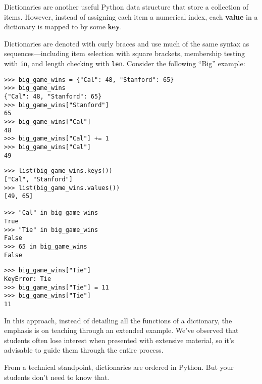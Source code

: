 \begin{blocksection}
Dictionaries are another useful Python data structure that store a collection of items. However, instead of assigning each item a numerical index, each \textbf{value} in a dictionary is mapped to by some \textbf{key}. 

Dictionaries are denoted with curly braces and use much of the same syntax as sequences---including item selection with square brackets, membership testing with \lstinline{in}, and length checking with \lstinline{len}. Consider the following ``Big'' example:
\begin{lstlisting}
>>> big_game_wins = {"Cal": 48, "Stanford": 65}
>>> big_game_wins 
{"Cal": 48, "Stanford": 65}
>>> big_game_wins["Stanford"]
65
>>> big_game_wins["Cal"]
48
>>> big_game_wins["Cal"] += 1
>>> big_game_wins["Cal"]
49
\end{lstlisting}
\end{blocksection}

\begin{blocksection}
\begin{lstlisting}
>>> list(big_game_wins.keys())
["Cal", "Stanford"]
>>> list(big_game_wins.values())
[49, 65]

>>> "Cal" in big_game_wins
True
>>> "Tie" in big_game_wins
False
>>> 65 in big_game_wins
False
\end{lstlisting}
\end{blocksection}

\begin{blocksection}
\begin{lstlisting}
>>> big_game_wins["Tie"]
KeyError: Tie
>>> big_game_wins["Tie"] = 11
>>> big_game_wins["Tie"]
11
\end{lstlisting}
\end{blocksection}

\begin{meta}
In this approach, instead of detailing all the functions of a dictionary, the emphasis is on teaching through an extended example. We've observed that students often lose interest when presented with extensive material, so it's advisable to guide them through the entire process.

From a technical standpoint, dictionaries are ordered in Python. But your students don't need to know that.
\end{meta}